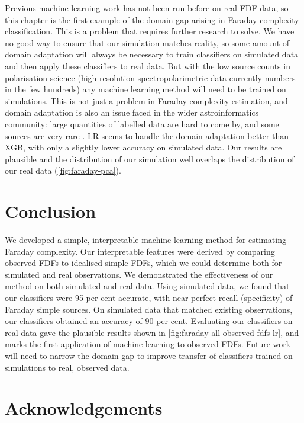     Previous machine learning work \citep[e.g.][]{brown_classifying_2018} has not been run before on real FDF data, so this chapter is the first example of the domain gap arising in Faraday complexity classification. This is a problem that requires further research to solve. We have no good way to ensure that our simulation matches reality, so some amount of domain adaptation will always be necessary to train classifiers on simulated data and then apply these classifiers to real data. But with the low source counts in polarisation science (high-resolution spectropolarimetric data currently numbers in the few hundreds) any machine learning method will need to be trained on simulations. This is not just a problem in Faraday complexity estimation, and domain adaptation is also an issue faced in the wider astroinformatics community: large quantities of labelled data are hard to come by, and some sources are very rare \citep[e.g. gravitational wave detections or fast radio bursts;][]{zevin17gravityspy, gebhard19convolutional,agarwal_fetch_2020}. LR seems to handle the domain adaptation better than XGB, with only a slightly lower accuracy on simulated data. Our results are plausible and the distribution of our simulation well overlaps the distribution of our real data (\autoref{fig:faraday-pca}).

\section{Conclusion}
\label{sec:faraday-conclusion}

  We developed a simple, interpretable machine learning method for estimating Faraday complexity. Our interpretable features were derived by comparing observed FDFs to idealised simple FDFs, which we could determine both for simulated and real observations. We demonstrated the effectiveness of our method on both simulated and real data. Using simulated data, we found that our classifiers were 95 per cent accurate, with near perfect recall (specificity) of Faraday simple sources. On simulated data that matched existing observations, our classifiers obtained an accuracy of 90 per cent. Evaluating our classifiers on real data gave the plausible results shown in \autoref{fig:faraday-all-observed-fdfs-lr}, and marks the first application of machine learning to observed FDFs. Future work will need to narrow the domain gap to improve transfer of classifiers trained on simulations to real, observed data.

\section{Acknowledgements}

